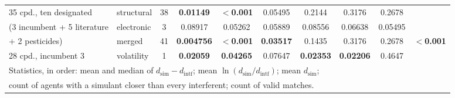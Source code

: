 \begin{table}[htb]
\begin{tabular}{llcccccccc}
\hline
35 cpd., ten designated & structural  & 38 & \textbf{0.01149} & \textbf{$<$0.001} & 0.05495 & 0.2144 & 0.3176 & 0.2678 &  \\
\quad (3 incumbent + 5 literature & electronic  &  3 & 0.08917 & 0.05262 & 0.05889 & 0.08556 & 0.06638 & 0.05495 &  \\
\quad + 2 pesticides)  & merged      & 41 & \textbf{0.004756} & \textbf{$<$0.001} & \textbf{0.03517} & 0.1435 & 0.3176 & 0.2678 & \textbf{$<$0.001} \\
\hline
28 cpd., incumbent 3   & volatility  &  1 & \textbf{0.02059} & \textbf{0.04265} & 0.07647 & \textbf{0.02353} & \textbf{0.02206} & 0.4647 &  \\
\hline
\hline
\multicolumn{10}{l}{\footnotesize Statistics, in order: mean and median of
$d_\mathrm{sim}-d_\mathrm{intf}$; mean $\ln(d_\mathrm{sim}/d_\mathrm{intf})$;
mean $d_\mathrm{sim}$;}\\
\multicolumn{10}{l}{\footnotesize count of agents with a simulant closer than
every interferent; count of valid matches.}\\
\end{tabular}
\end{table}
